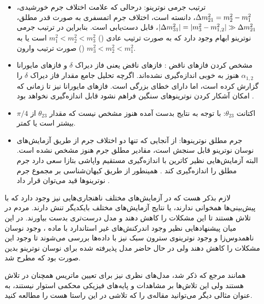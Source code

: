 \documentclass[a4paper]{book}
\begin{document}
\begin{itemize}
	\item ترتیب جرمی نوترینو:
درحالی که علامت اختلاف جرم خورشیدی، {\footnotesize$\Delta m_{\rm 21}^2=m_2^2-m_1^2$}، دانسته است، اختلاف جرم اتمسفری به صورت قدر مطلق، {\footnotesize$|\Delta m_{\rm 31}^2|=|m_3^2-m_{1,2}^2| \gg \Delta m_{\rm 21}^2$}، قابل دست‌یابی است. بنابراین در ترتیب جرمی نوترینو ابهام وجود دارد که به صورت ترتیب عادی () {\footnotesize$m_1^2<m_2^2<m_3^2$} است یا به صورت ترتیب وارون () {\footnotesize$m_3^2<m_2^2<m_1^2$}.
	\item مشخص کردن فازهای ناقض :
فازهای ناقض  یعنی فاز دیراک {\footnotesize$\delta$} و فازهای مایورانا {\footnotesize$\alpha_{1,2}$} هنوز به خوبی اندازه‌گیری نشده‌اند. اگرچه تحلیل جامع \cite{Esteban:2020cvm} مقدار فاز دیراک {\footnotesize$\delta$} را گزارش کرده است، اما دارای خطای بزرگی است. فازهای مایورانا نیز تا زمانی که امکان آشکار کردن نوترینوهای سنگین فراهم نشود قابل اندازه‌گیری نخواهد بود \cite{Drewes:2016jae}.
	\item اکتانت {\footnotesize$\theta_{23}$}:
	با توجه به نتایج بدست آمده هنوز مشخص نیست که مقدار {\footnotesize$\theta_{23}$} از {\footnotesize$\pi/4$} بیشتر‌ است یا کمتر.
	\item جرم مطلق نوترینوها:
از آنجایی که تنها دو اختلاف جرم از طریق آزمایش‌های نوسان نوترینو قابل سنجش است، مقادیر مطلق جرم هنوز مشخص نشده است. البته آزمایش‌هایی نظیر کاترین با اندازه‌گیری مستقیم واپاشی بتازا سعی دارد جرم مطلق را اندازه‌گیری کند \cite{KATRIN:2019yun}. همینطور از طریق کیهان‌شناسی بر مجموع جرم نوترینوها قید می‌توان قرار داد \cite{Planck:2018vyg}.
\end{itemize}

لازم بذکر هست که در آزمایش‌های مختلف ناهنجاری‌هایی نیز وجود دارد که با پیش‌بینی‌ها همخوانی ندارند، یا نتایج آزمایش‌های مختلف بایکدیگر تنش دارند.
مردم در تلاش هستند تا این مشکلات را کاهش دهند و مدل درست‌تری بدست بیاورند. در این میان پیشنهادهایی نظیر وجود اندرکنش‌های غیر استاندارد با ماده \cite{Farzan:2017xzy}، وجود نوسان ناهمدوس‌زا \cite{DeRomeri:2023dht} و وجود نوترینوی سترون سبک \cite{Dasgupta:2021ies} نیز با داده‌ها بررسی می‌شوند تا وجود این مشکلات را کاهش دهند ولی در حال حاضر مدل پذیرفته شده برای نوسان نوترینو بدین صورت بود که مطرح شد.

همانند مرجع \cite{Harrison:2002er} که ذکر شد، مدل‌های نظری نیز برای تعیین ماتریس  همچنان در تلاش هستند ولی این تلاش‌ها بر مشاهدات و پایه‌های فیزیکی محکمی استوار نیستند، به عنوان مثالی دیگر می‌توانید مقاله‌ی \cite{Costa:2023bxw} را که تلاشی در این راستا هست را مطالعه کنید.
		
\end{document}
